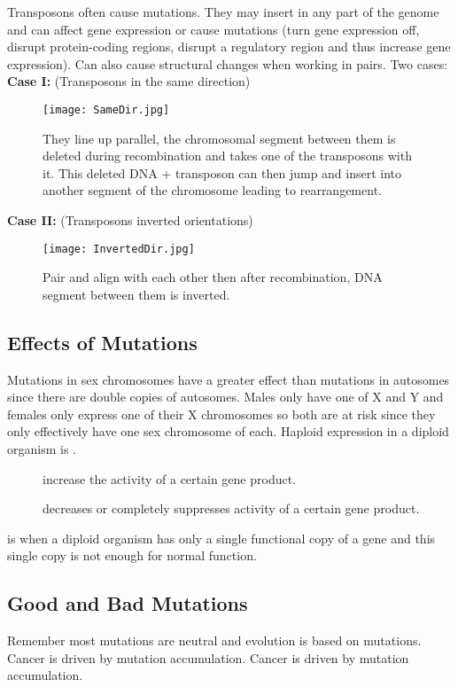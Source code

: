 \documentclass[../Bio_chemistryReview.tex]{subfiles}
\begin{document}
Transposons often cause mutations. They may insert in any part of the genome and
can affect gene expression or cause mutations (turn gene expression off, disrupt
protein-coding regions, disrupt a regulatory region and thus increase gene
expression). Can also cause structural changes when working in pairs. Two
cases:\\
\textbf{Case I:} (Transposons in the same direction)\\
\begin{figure}[H]
  \centering
  \texttt{[image: SameDir.jpg]}
  \caption{They line up parallel, the chromosomal segment between them is deleted during
recombination and takes one of the transposons with it. This deleted DNA +
transposon can then jump and insert into another segment of the chromosome
leading to rearrangement.}
\end{figure}

\noindent\textbf{Case II:} (Transposons inverted orientations)\\
\begin{figure}[H]
  \centering
  \texttt{[image: InvertedDir.jpg]}
  \caption{Pair and align with each other then after recombination, DNA segment between
them is inverted.}
\end{figure}

\subsection{Effects of Mutations}
Mutations in sex chromosomes have a greater effect than mutations in autosomes
since there are double copies of autosomes. Males only have one of X and Y and
females only express one of their X chromosomes so both are at risk since they
only effectively have one sex chromosome of each. Haploid expression in a
diploid organism is .
\begin{description}
  \item[] increase the activity of a certain
    gene product.
  \item[] decreases or completely suppresses
    activity of a certain gene product.
\end{description}
 is when a diploid organism has only a single
functional copy of a gene and this single copy is not enough for normal
function.

\subsection{Good and Bad Mutations}
Remember most mutations are neutral and evolution is based on mutations. Cancer
is driven by mutation accumulation. Cancer is driven by mutation accumulation.
\end{document}
